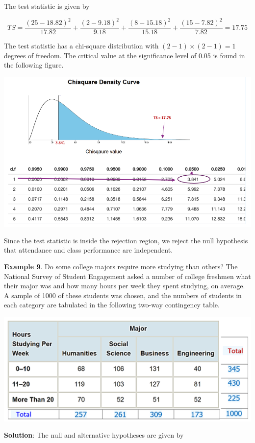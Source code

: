 \documentclass[
]{book}
\begin{document}
The test statistic is given by

\[
TS = \frac{(25-18.82)^2}{17.82} + \frac{(2-9.18)^2}{9.18} + \frac{(8-15.18)^2}{15.18} + \frac{(15-7.82)^2}{7.82} = 17.75
\]

The test statistic has a chi-square distribution with \((2-1)\times (2-1) = 1\) degrees of freedom. The critical value at the significance level of 0.05 is found in the following figure.

\begin{center}\includegraphics[width=0.85\linewidth]{week13/example08ChisqCV} \end{center}

Since the test statistic is inside the rejection region, we reject the null hypothesis that attendance and class performance are independent.

\textbf{Example 9}. Do some college majors require more studying than others? The National Survey of Student Engagement asked a number of college freshmen what their major was and how many hours per week they spent studying, on average. A sample of 1000 of these students was chosen, and the numbers of students in each category are tabulated in the following two-way contingency table.

\begin{center}\includegraphics[width=0.6\linewidth]{week13/example09Data} \end{center}

\textbf{Solution}: The null and alternative hypotheses are given by
\end{document}
